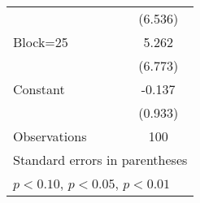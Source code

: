 {\begin{tabular}{l*{1}{c}}
                    &     (6.536)         \\
[1em]
Block=25            &       5.262         \\
                    &     (6.773)         \\
[1em]
Constant            &      -0.137         \\
                    &     (0.933)         \\
\hline
Observations        &         100         \\
\hline\hline
\multicolumn{2}{l}{\footnotesize Standard errors in parentheses}\\
\multicolumn{2}{l}{\footnotesize \sym{*} \(p<0.10\), \sym{**} \(p<0.05\), \sym{***} \(p<0.01\)}\\
\end{tabular}
}
